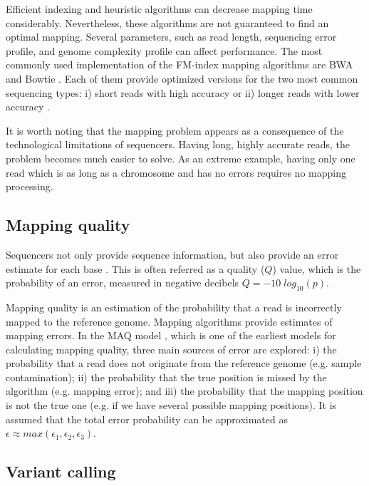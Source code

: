 Efficient indexing and heuristic algorithms can decrease mapping time considerably.  Nevertheless, these algorithms are not guaranteed to find an optimal mapping.  Several parameters, such as read length, sequencing error profile, and genome complexity profile can affect performance.  The most commonly used implementation of the FM-index mapping algorithms are BWA \cite{li2010fast, li2010fastlong} and Bowtie \cite{langmead2009ultrafast, langmead2012fast}.  Each of them provide optimized versions for the two most common sequencing types: i) short reads with high accuracy \cite{li2010fast,langmead2009ultrafast} or ii) longer reads with lower accuracy \cite{li2010fastlong, langmead2012fast}.

It is worth noting that the mapping problem appears as a consequence of the technological limitations of sequencers.  Having long, highly accurate reads, the problem becomes much easier to solve.  As an extreme example, having only one read which is as long as a chromosome and has no errors requires no mapping processing.  

\subsection{Mapping quality \label{sec:mapq}}

Sequencers not only provide sequence information, but also provide an error estimate for each base \cite{li2011statistical}.  This is often referred as a quality ($Q$) value, which is the probability of an error, measured in negative decibels $Q = -10 \; log_{10}(p)$.

Mapping quality is an estimation of the probability that a read is incorrectly mapped to the reference genome. Mapping algorithms provide estimates of mapping errors. In the MAQ model \cite{li2008mapping}, which is one of the earliest models for calculating mapping quality, three main sources of error are explored: i) the probability that a read does not originate from the reference genome (e.g. sample contamination); ii) the probability that the true position is missed by the algorithm (e.g. mapping error); and iii) the probability that the mapping position is not the true one (e.g. if we have several possible mapping positions). It is assumed that the total error probability can be approximated as $\epsilon \approx max(\epsilon_1,\epsilon_2, \epsilon_3)$.

\subsection{Variant calling}

